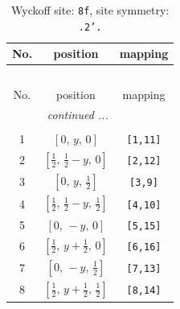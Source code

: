 \documentclass[fleqn,8pt]{jsarticle}
\begin{document}
\begin{longtable}{ccc}
\caption{Wyckoff site: {\tt 8f}, site symmetry: {\tt .2'.}}
 \\
 \hline \hline
No. & position & mapping \\ \hline \endfirsthead

\multicolumn{2}{l}{\tablename\ \thetable{}} \\
 \hline \hline
No. & position & mapping \\ \hline \endhead

 \hline \hline
\multicolumn{2}{r}{\footnotesize\it continued ...} \\ \endfoot

 \hline \hline
\multicolumn{2}{r}{} \\ \endlastfoot

1 & $\left[ 0,\, y,\, 0 \right]$ & {\tt [1,11]} \\ \hline
2 & $\left[ \frac{1}{2},\, \frac{1}{2} - y,\, 0 \right]$ & {\tt [2,12]} \\ \hline
3 & $\left[ 0,\, y,\, \frac{1}{2} \right]$ & {\tt [3,9]} \\ \hline
4 & $\left[ \frac{1}{2},\, \frac{1}{2} - y,\, \frac{1}{2} \right]$ & {\tt [4,10]} \\ \hline
5 & $\left[ 0,\, - y,\, 0 \right]$ & {\tt [5,15]} \\ \hline
6 & $\left[ \frac{1}{2},\, y + \frac{1}{2},\, 0 \right]$ & {\tt [6,16]} \\ \hline
7 & $\left[ 0,\, - y,\, \frac{1}{2} \right]$ & {\tt [7,13]} \\ \hline
8 & $\left[ \frac{1}{2},\, y + \frac{1}{2},\, \frac{1}{2} \right]$ & {\tt [8,14]} \\
\end{longtable}
\renewcommand{\arraystretch}{1.2}
\end{document}
